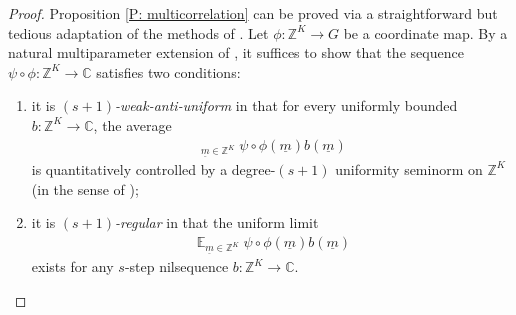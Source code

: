 \documentclass[11pt]{amsart}
\theoremstyle{definition}
\DeclareMathOperator*{\oE}{\overline{\mathbb{E}}}
\DeclareMathOperator*{\E}{\mathbb{E}}
\newcommand{\C}{{\mathbb C}}
\newcommand{\R}{{\mathbb R}}
\newcommand{\Z}{{\mathbb Z}}
\newcommand{\um}{{\underline{m}}}
\newcommand{\1}{{\mathbf{1}}}
\begin{document}
\begin{proof}
   Proposition \ref{P: multicorrelation} can be proved via a straightforward but tedious adaptation of the methods of \cite{Fr15, FH18, Ko18}. 
Let $\phi:\Z^K\to G$ be a coordinate map.
    By a natural multiparameter extension of \cite[Theorem 2.1]{Ko18}, it suffices to show that the sequence $\psi\circ \phi:\Z^K\to\C$ satisfies two conditions: 
    \begin{enumerate}
        \item it is \textit{$(s+1)$-weak-anti-uniform} in that for every uniformly bounded $b:\Z^K\to\C$, the average
    \begin{align*}
        \oE_{\um\in\Z^K}\psi\circ \phi(\um)b(\um)
    \end{align*}
    is quantitatively controlled by a degree-$(s+1)$ uniformity seminorm on $\Z^K$ (in the sense of \cite{Ko18});
        \item it is \textit{$(s+1)$-regular} in that the uniform limit
    \begin{align*}
        \E_{\um\in\Z^K}\psi\circ \phi(\um)b(\um)
    \end{align*}
    exists
    for any $s$-step nilsequence $b:\Z^K\to\C$.
    \end{enumerate}

    

\end{proof}
\end{document}
